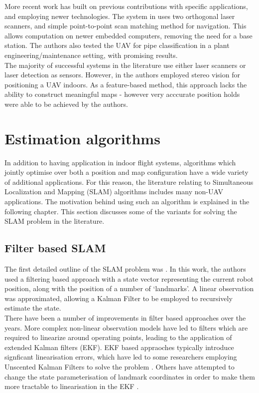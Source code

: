 \documentclass[capstone_report.tex]{subfiles}
\begin{document}
More recent work has built on previous contributions with specific applications, and employing newer technologies. The system in \cite{kumar} uses two orthogonal laser scanners, and simple point-to-point scan matching method for navigation. This allows computation on newer embedded computers, removing the need for a base station. The authors also tested the UAV for pipe classification in a plant engineering/maintenance setting, with promising results.\\

The majority of successful systems in the literature use either laser scanners or laser detection as sensors. However, in \cite{mustafah} the authors employed stereo vision for positioning a UAV indoors. As a feature-based method, this approach lacks the ability to construct meaningful maps - however very acccurate position holds were able to be achieved by the authors.

\section{Estimation algorithms}
In addition to having application in indoor flight systems, algorithms which jointly optimise over both a position and map configuration have a wide variety of additional applications. For this reason, the literature relating to Simultaneous Localization and Mapping (SLAM) algorithms includes many non-UAV applications. The motivation behind using such an algorithm is explained in the following chapter. This section discusses some of the variants for solving the SLAM problem in the literature.\\

\subsection{Filter based SLAM}

The first detailed outline of the SLAM problem was \cite{smithcheese}. In this work, the authors used a filtering based approach with a state vector representing the current robot position, along with the position of a number of `landmarks'. A linear observation was approximated, allowing a Kalman Filter to be employed to recursively estimate the state.\\

There have been a number of improvements in filter based approaches over the years. More complex non-linear observation models have led to filters which are required to linearize around operating points, leading to the application of extended Kalman filters (EKF). EKF based appraoches typically introduce signficant linearisation errors, which have led to some researchers employing Unscented Kalman Filters to solve the problem \cite{julier}. Others have attempted to change the state parameterisation of landmark coordinates in order to make them more tractable to linearisation in the EKF \cite{julier}.
\end{document}
